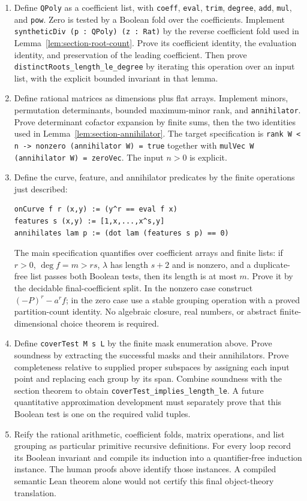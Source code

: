 \begin{enumerate}
\item Define \texttt{QPoly} as a coefficient list, with
\texttt{coeff}, \texttt{eval}, \texttt{trim}, \texttt{degree},
\texttt{add}, \texttt{mul}, and \texttt{pow}. Zero is tested by a
Boolean fold over the coefficients. Implement
\texttt{syntheticDiv (p : QPoly) (z : Rat)} by the reverse coefficient
fold used in Lemma~\ref{lem:section-root-count}. Prove its coefficient
identity, the evaluation identity, and preservation of the leading
coefficient. Then prove \texttt{distinctRoots\_length\_le\_degree}
by iterating this operation over an input list, with the explicit
bounded invariant in that lemma.
\item Define rational matrices as dimensions plus flat arrays.
Implement minors, permutation determinants, bounded maximum-minor
rank, and \texttt{annihilator}. Prove determinant cofactor expansion
by finite sums, then the two identities used in
Lemma~\ref{lem:section-annihilator}. The target specification is
\texttt{rank W < n -> nonzero (annihilator W) = true}
together with \texttt{mulVec W (annihilator W) = zeroVec}.
The input $n>0$ is explicit.
\item Define
the curve, feature, and annihilator predicates by the finite operations
just described:
\begin{lstlisting}
onCurve f r (x,y) := (y^r == eval f x)
features s (x,y) := [1,x,...,x^s,y]
annihilates lam p := (dot lam (features s p) == 0)
\end{lstlisting}
The main specification quantifies over coefficient arrays and
finite lists:
if $r>0$, $\deg f=m>rs$, $\lambda$ has length $s+2$ and is
nonzero, and a duplicate-free list passes both Boolean tests, then
its length is at most $m$. Prove it by the decidable final-coefficient
split. In the nonzero case construct $(-P)^r-a^rf$; in the zero
case use a stable grouping operation with a proved partition-count
identity. No algebraic closure, real numbers, or abstract
finite-dimensional choice theorem is required.
\item Define \texttt{coverTest M s L} by the finite mask enumeration
above. Prove soundness by extracting the successful masks and their
annihilators. Prove completeness relative to supplied proper
subspaces by assigning each input point and replacing each group
by its span. Combine soundness with the section theorem to obtain
\texttt{coverTest\_implies\_length\_le}. A future quantitative
approximation development must separately prove that this Boolean
test is one on the required valid tuples.
\item Reify the rational arithmetic, coefficient folds, matrix
operations, and list grouping as particular primitive recursive
definitions. For every loop record its Boolean invariant and
compile its induction into a quantifier-free induction instance.
The human proofs above identify those instances. A compiled
semantic Lean theorem alone would not certify this final
object-theory translation.
\end{enumerate}

